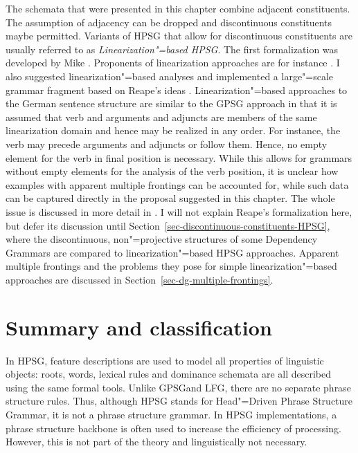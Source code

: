 \label{sec-linearization-HPSG}

The schemata that were presented in this chapter combine adjacent constituents. The assumption of
adjacency can be dropped and discontinuous constituents maybe permitted. Variants of HPSG that allow
for discontinuous constituents are usually referred to as \emph{Linearization"=based HPSG}. The
first formalization was developed by Mike \citet{Reape91,Reape92a,Reape94a}. Proponents of linearization
approaches are for instance
\citet{Kathol95a,Kathol2000a,DS99a,RS99a,Crysmann2003c,BS2004a,Sato:06cluk,Wetta2011a}. I also
suggested linearization"=based analyses \citep{Mueller99a,Mueller2002b} and implemented a
large"=scale grammar fragment based on Reape's ideas \citep{Babel}. Linearization"=based approaches
to the German sentence structure are similar to the GPSG approach in that it is assumed that verb
and arguments and adjuncts are members of the same linearization domain and hence may be realized in
any order. For instance, the verb may precede arguments and adjuncts or follow them. Hence, no empty element for the verb in
final position is necessary. While this allows for grammars without empty elements for the analysis of the verb
position, it is unclear how examples with apparent multiple frontings can be accounted for, while
such data can be captured directly in the proposal suggested in this chapter. The
whole issue is discussed in more detail in . I will not explain Reape's
formalization here, but defer its discussion until Section~\ref{sec-discontinuous-constituents-HPSG}, where the discontinuous, non"=projective
structures of some Dependency Grammars are compared to linearization"=based HPSG
approaches. Apparent multiple frontings and the problems they pose for simple linearization"=based
approaches are discussed in Section~\ref{sec-dg-multiple-frontings}.


\section{Summary and classification}

In HPSG, feature descriptions are used to model all properties of linguistic objects: roots, words, lexical rules and dominance schemata are
all described using the same formal tools. Unlike GPSG\indexgpsg and LFG\indexlfg, there are no separate phrase structure rules. Thus, although
HPSG stands for Head"=Driven Phrase Structure Grammar, it is not a phrase structure grammar. In HPSG implementations, a phrase structure backbone
is often used to increase the efficiency of processing. However, this is not part of the theory and
linguistically not necessary.

